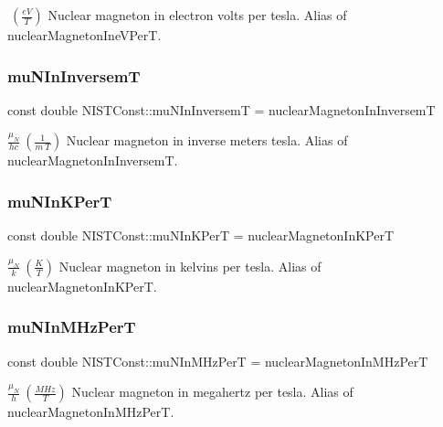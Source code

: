 $ \ (\frac{eV}{T})$ Nuclear magneton in electron volts per tesla. Alias of nuclear\+Magneton\+Ine\+V\+PerT. \mbox{\label{group___nuclear_magneton_ga9c4499c279614bf4bb837c9c4c74b208}} 
\subsubsection{\texorpdfstring{mu\+N\+In\+InversemT}{muNInInversemT}}
{\footnotesize\ttfamily const double N\+I\+S\+T\+Const\+::mu\+N\+In\+InversemT = nuclear\+Magneton\+In\+InversemT}

$\frac{\mu_N}{hc} \ (\frac{1}{m\ T})$ Nuclear magneton in inverse meters tesla. Alias of nuclear\+Magneton\+In\+InversemT. \mbox{\label{group___nuclear_magneton_gaca6a801a34347be9fd04e7882187484c}} 
\subsubsection{\texorpdfstring{mu\+N\+In\+K\+PerT}{muNInKPerT}}
{\footnotesize\ttfamily const double N\+I\+S\+T\+Const\+::mu\+N\+In\+K\+PerT = nuclear\+Magneton\+In\+K\+PerT}

$\frac{\mu_N}{k} \ (\frac{K}{T})$ Nuclear magneton in kelvins per tesla. Alias of nuclear\+Magneton\+In\+K\+PerT. \mbox{\label{group___nuclear_magneton_ga4c2e37b42112c282a0dc5969f351187e}} 
\subsubsection{\texorpdfstring{mu\+N\+In\+M\+Hz\+PerT}{muNInMHzPerT}}
{\footnotesize\ttfamily const double N\+I\+S\+T\+Const\+::mu\+N\+In\+M\+Hz\+PerT = nuclear\+Magneton\+In\+M\+Hz\+PerT}

$\frac{\mu_N}{h} \ (\frac{MHz}{T})$ Nuclear magneton in megahertz per tesla. Alias of nuclear\+Magneton\+In\+M\+Hz\+PerT. \mbox{\label{group___nuclear_magneton_gacf9b0d2a2517113d30300e4ed7b56cc7}} 
